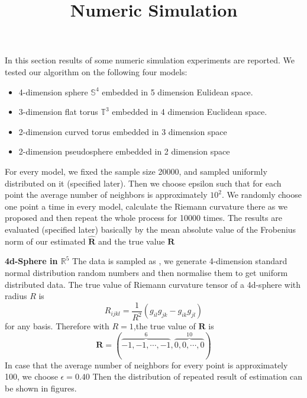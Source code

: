 \documentclass{article}
\title{Numeric Simulation}
\author{}
\date{}
\begin{document}
\maketitle
In this section results of some numeric simulation experiments are reported. We tested our algorithm on the following four models:
\begin{itemize}
	\item 4-dimension sphere $\mathbb{S}^4$ embedded in 5 dimension Eulidean space.
	\item 3-dimension flat torus $\mathbb{T}^3$ embedded in 4 dimension Euclidean space.
	\item 2-dimension curved torus embedded in 3 dimension space
	\item 2-dimension pseudosphere embedded in 2 dimension space
\end{itemize}
For every model, we fixed the sample size 20000, and sampled uniformly distributed on it (specified later). Then we choose epsilon such that for each point the average number of neighbors is approximately $10^2$. We randomly choose one point a time in every model, calculate the Riemann curvature there as we proposed and then repeat the whole process for 10000 times. The results are evaluated (specified later) basically by the mean absolute value of the Frobenius norm of our estimated $\widehat{\boldsymbol{R}}$ and the true value $\boldsymbol{R}$
\\
\par
\textbf{4d-Sphere in $\mathbb{R}^5$} The data is sampled as \cite{Uniform}, we generate 4-dimension standard normal distribution random numbers and then normalise them to get uniform distributed data. The true value of Riemann curvature tensor of a 4d-sphere with radius $R$ is
\begin{equation}
	R_{ijkl}=\frac{1}{R^2}(g_{il}g_{jk}-g_{ik}g_{jl})
\end{equation}
for any basis. Therefore with $R=1$,the true value of $\boldsymbol{R}$ is
\begin{equation}
	\boldsymbol{R}=(\overbrace{-1,-1,\cdots,-1}^{6},\overbrace{0,0,\cdots,0}^{10})
\end{equation} In case that the average number of neighbors for every point is approximately 100, we choose $\epsilon=0.40$
Then the distribution of repeated result of estimation can be shown in figures. 
\end{document}
